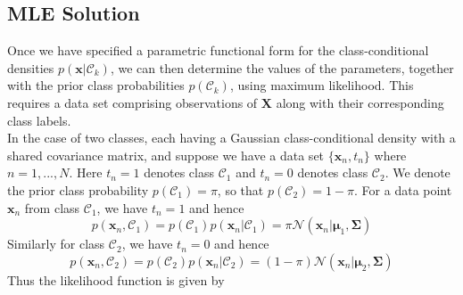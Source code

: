 \documentclass[twoside]{article}
\begin{document}
\subsection{MLE Solution}
Once we have specified a parametric functional form for the class-conditional densities $p(\boldsymbol{x}|\mathcal{C}_k)$, we can then determine the values of the parameters, together with the prior class probabilities $p(\mathcal{C}_k)$, using maximum likelihood. This requires a data set comprising observations of $\boldsymbol{X}$ along with their corresponding class labels.\\
In the case of two classes, each having a Gaussian class-conditional density with a shared covariance matrix, and suppose we have a data set $\{\boldsymbol{x}_n, t_n\}$ where $n = 1,..., N$. Here $t_n = 1$ denotes class $\mathcal{C}_1$ and $t_n = 0$ denotes class $\mathcal{C}_2$. We denote the prior class probability $p(\mathcal{C}_1) = \pi$, so that $p(\mathcal{C}_2) = 1 - \pi$. For a data point $\boldsymbol{x}_n$ from class $\mathcal{C}_1$, we have $t_n = 1$ and hence
\begin{equation*}
    p(\boldsymbol{x}_n, \mathcal{C}_1) = p(\mathcal{C}_1)p(\boldsymbol{x}_n| \mathcal{C}_1)=\pi\mathcal{N}(\boldsymbol{x}_n|\boldsymbol{\mu}_1, \boldsymbol{\Sigma})
\end{equation*}
Similarly for class $\mathcal{C}_2$, we have $t_n = 0$ and hence
\begin{equation*}
     p(\boldsymbol{x}_n, \mathcal{C}_2) = p(\mathcal{C}_2)p(\boldsymbol{x}_n| \mathcal{C}_2)=(1 -\pi)\mathcal{N}(\boldsymbol{x}_n|\boldsymbol{\mu}_2, \boldsymbol{\Sigma})
\end{equation*}
Thus the likelihood function is given by
\begin{equation*}
    
\end{equation*}
\end{document}
